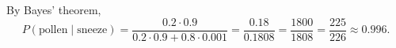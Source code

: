 By Bayes' theorem,
\[P(\text{pollen}\mid\text{sneeze})=\dfrac{0.2\cdot0.9}{0.2\cdot0.9+0.8\cdot0.001}=\dfrac{0.18}{0.1808}=\dfrac{1800}{1808}=\boxed{\dfrac{225}{226}}\approx0.996.\]
